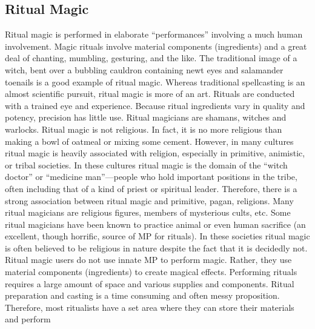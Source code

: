 \documentclass[twoside]{book}
\begin{document}
\subsection{Ritual Magic}
      Ritual magic is performed in elaborate
               “performances” involving a much human
               involvement. Magic rituals involve material components
               (ingredients) and a great deal of chanting, mumbling,
               gesturing, and the like. The traditional image of a witch,
               bent over a bubbling cauldron containing newt eyes and
               salamander toenails is a good example of ritual magic.
               Whereas traditional spellcasting is an almost scientific
               pursuit, ritual magic is more of an art. Rituals are
               conducted with a trained eye and experience. Because
               ritual ingredients vary in quality and potency, precision
               has little use. Ritual magicians are shamans, witches and
               warlocks.   Ritual magic is not religious. In fact, it is no
               more religious than making a bowl of oatmeal or mixing
               some cement. However, in many cultures ritual magic is
               heavily associated with religion, especially in primitive,
               animistic, or tribal societies. In these cultures ritual
               magic is the domain of the “witch doctor” or
               “medicine man”—people who hold important
               positions in the tribe, often including that of a kind of
               priest or spiritual leader. Therefore, there is a strong
               association between ritual magic and primitive, pagan,
               religions. Many ritual magicians are religious figures,
               members of mysterious cults, etc. Some ritual magicians
               have been known to practice animal or even human sacrifice
               (an excellent, though horrific, source of MP for rituals).
               In these societies ritual magic is often believed to be
               religious in nature despite the fact that it is decidedly
               not.   Ritual magic users do not use innate MP to perform
               magic. Rather, they use material components (ingredients)
               to create magical effects. Performing rituals requires a
               large amount of space and various supplies and components.
               Ritual preparation and casting is a time consuming and
               often messy proposition. Therefore, most ritualists have a
               set area where they can store their materials and perform
\end{document}
